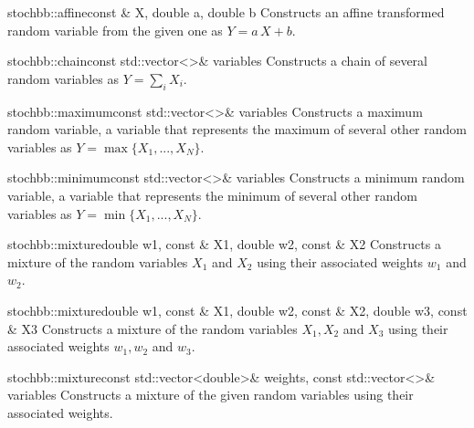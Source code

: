 \begin{deffunc}{stochbb::affine}{}{const \& X, double a, double b}
Constructs an affine transformed random variable from the given one as $Y = a\,X+b$.
\end{deffunc}

\begin{deffunc}{stochbb::chain}{}{const std::vector<>\& variables}
Constructs a chain of several random variables as $Y = \sum_i X_i$. 
\end{deffunc}

\begin{deffunc}{stochbb::maximum}{}{const std::vector<>\& variables}
Constructs a maximum random variable, a variable that represents the maximum of several other random variables as $Y = \max\{X_1,...,X_N\}$.
\end{deffunc}

\begin{deffunc}{stochbb::minimum}{}{const std::vector<>\& variables}
Constructs a minimum random variable, a variable that represents the minimum of several other random variables as $Y = \min\{X_1,...,X_N\}$.
\end{deffunc}

\begin{deffunc}{stochbb::mixture}{}{double w1, const \& X1, double w2, const \& X2}
Constructs a mixture of the random variables $X_1$ and $X_2$ using their associated weights $w_1$ and $w_2$.
\end{deffunc}

\begin{deffunc}{stochbb::mixture}{}{double w1, const \& X1, double w2, const \& X2, double w3, const \& X3}
Constructs a mixture of the random variables $X_1, X_2$ and $X_3$ using their associated weights $w_1, w_2$ and $w_3$.
\end{deffunc}

\begin{deffunc}{stochbb::mixture}{}{const std::vector<double>\& weights, const std::vector<>\& variables}
Constructs a mixture of the given random variables using their associated weights.
\end{deffunc}

